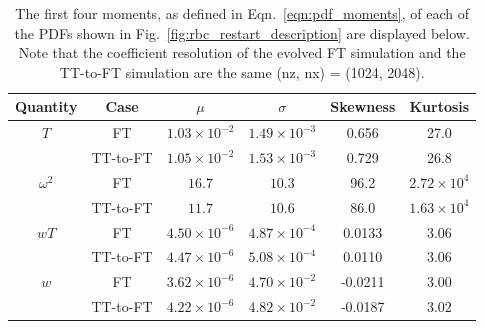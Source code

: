 \documentclass[aps, pre, onecolumn, nofootinbib, notitlepage, groupedaddress, amsfonts, amssymb, amsmath, longbibliography, superscriptaddress]{revtex4-1}
\newcommand{\ea}[1]{{\color{red} #1}}
\begin{document}
\begin{table}[b!]
\vspace{-0.5cm}
\caption{ 
	The first four moments, as defined in Eqn.~\ref{eqn:pdf_moments}, of each of the PDFs shown in Fig.~\ref{fig:rbc_restart_description} are displayed below.
	\ea{Note that the coefficient resolution of the evolved FT simulation and the TT-to-FT simulation are the same (nz, nx) = (1024, 2048).}
}
\vspace{-0.25cm}
\setlength{\tabcolsep}{12pt}
\label{table:pdf_values}
\begin{center}
\begin{tabular}{c c c c c c}
\hline																	
Quantity &	Case	&	$\mu$	&	$\sigma$	&	Skewness	&	Kurtosis \\
\hline
$T$				&	FT			&		$1.03 \times 10^{-2}$	&	$1.49 \times 10^{-3}$	&	0.656		&	27.0 \\
				&	TT-to-FT	&		$1.05 \times 10^{-2}$	&	$1.53 \times 10^{-3}$	&	0.729		&	26.8 \\
\hline
$\omega^2$		&	FT			&		$16.7$					&	$10.3$					&	96.2		&	$2.72 \times 10^4$ \\
				&	TT-to-FT	&		$11.7$					&	$10.6$					&	86.0		&	$1.63 \times 10^4$ \\
\hline
$wT$			&	FT			&		$4.50 \times 10^{-6}$	&	$4.87 \times 10^{-4}$	&	0.0133	&	$3.06$ \\
				&	TT-to-FT	&		$4.47 \times 10^{-6}$	&	$5.08 \times 10^{-4}$	&	0.0110	&	$3.06$ \\
\hline
$w$				&	FT			&		$3.62 \times 10^{-6}$	&	$4.70 \times 10^{-2}$	&	-0.0211	&	$3.00$ \\
				&	TT-to-FT	&		$4.22 \times 10^{-6}$	&	$4.82 \times 10^{-2}$	&	-0.0187	&	$3.02$ \\
\hline																	
\end{tabular}
\end{center}
\end{table}
\end{document}
